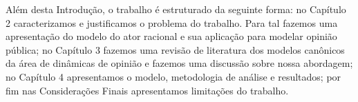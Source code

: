 Além desta Introdução, o trabalho é estruturado da seguinte forma: no Capítulo 2
caracterizamos e justificamos o problema do trabalho. Para tal fazemos uma
apresentação do modelo do ator racional e sua aplicação para modelar opinião
pública; no Capítulo 3 fazemos uma revisão de literatura dos modelos canônicos
da área de dinâmicas de opinião e fazemos uma discussão sobre nossa abordagem;
no Capítulo 4 apresentamos o modelo, metodologia de análise e resultados;  por
fim nas Considerações Finais apresentamos limitações do trabalho.








